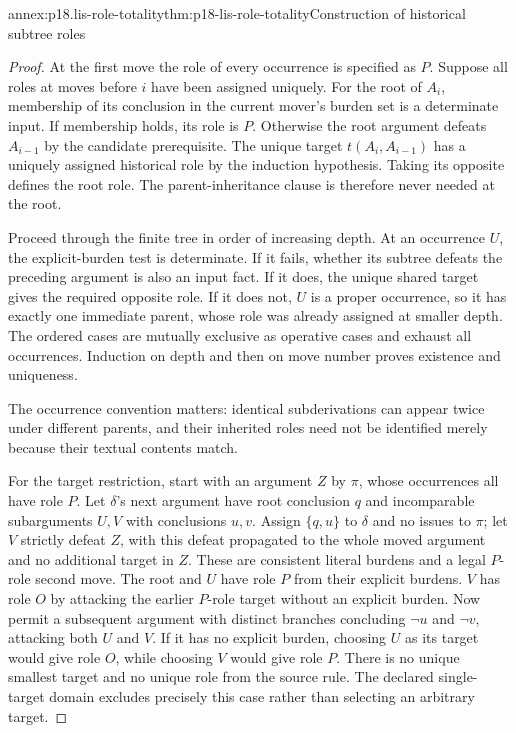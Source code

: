 \begin{annexitem}{annex:p18.lis-role-totality}{thm:p18-lis-role-totality}{Construction of historical subtree roles}
\begin{proof}
At the first move the role of every occurrence is specified as \(P\).
Suppose all roles at moves before \(i\) have been assigned uniquely.
For the root of \(A_i\), membership of its conclusion in the
current mover's burden set is a determinate input.
If membership holds, its role is \(P\).
Otherwise the root argument defeats \(A_{i-1}\) by the candidate
prerequisite. The unique target \(t(A_i,A_{i-1})\) has a uniquely
assigned historical role by the induction hypothesis.
Taking its opposite defines the root role.
The parent-inheritance clause is therefore never needed at the root.

Proceed through the finite tree in order of increasing depth.
At an occurrence \(U\), the explicit-burden test is determinate.
If it fails, whether its subtree defeats the preceding argument
is also an input fact. If it does, the unique shared target gives
the required opposite role. If it does not, \(U\) is a proper
occurrence, so it has exactly one immediate parent, whose role
was already assigned at smaller depth.
The ordered cases are mutually exclusive as operative cases
and exhaust all occurrences. Induction on depth and then on
move number proves existence and uniqueness.

The occurrence convention matters: identical subderivations can
appear twice under different parents, and their inherited roles
need not be identified merely because their textual contents match.

For the target restriction, start with an argument \(Z\) by
\(\pi\), whose occurrences all have role \(P\).
Let \(\delta\)'s next argument have root conclusion \(q\) and
incomparable subarguments \(U,V\) with conclusions \(u,v\).
Assign \(\{q,u\}\) to \(\delta\) and no issues to \(\pi\);
let \(V\) strictly defeat \(Z\), with this defeat propagated
to the whole moved argument and no additional target in \(Z\).
These are consistent literal burdens and a legal \(P\)-role
second move. The root and \(U\) have role \(P\) from their
explicit burdens. \(V\) has role \(O\) by attacking the earlier
\(P\)-role target without an explicit burden.
Now permit a subsequent argument with distinct branches concluding
\(\neg u\) and \(\neg v\), attacking both \(U\) and \(V\).
If it has no explicit burden, choosing \(U\) as its target would
give role \(O\), while choosing \(V\) would give role \(P\).
There is no unique smallest target and no unique role from the
source rule. The declared single-target domain excludes precisely
this case rather than selecting an arbitrary target.
\end{proof}
\end{annexitem}

